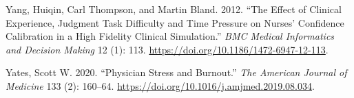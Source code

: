 \documentclass[a4paper, nobind]{templates/ociamthesis}
\newlength{\cslhangindent}
\newenvironment{CSLReferences}[2] %
 {%
  \setlength{\parindent}{0pt}
  \ifodd #1
  \let\oldpar\par
  \def\par{\hangindent=\cslhangindent\oldpar}
  \fi
  \setlength{\parskip}{1mm}
  \setlength{\baselineskip}{6mm}
 }%
 {}
\begin{document}
\begin{CSLReferences}{1}{0}
Yang, Huiqin, Carl Thompson, and Martin Bland. 2012. {``The Effect of Clinical Experience, Judgment Task Difficulty and Time Pressure on Nurses' Confidence Calibration in a High Fidelity Clinical Simulation.''} \emph{BMC Medical Informatics and Decision Making} 12 (1): 113. \url{https://doi.org/10.1186/1472-6947-12-113}.

Yates, Scott W. 2020. {``Physician {Stress} and {Burnout}.''} \emph{The American Journal of Medicine} 133 (2): 160--64. \url{https://doi.org/10.1016/j.amjmed.2019.08.034}.

\end{CSLReferences}

\end{document}
